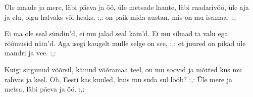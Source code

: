 \"Ule maade ja mere, l\"abi p\"aeva ja \"o\"o,
\"ule metsade laante, l\"abi raadariv\"o\"o,
\"ule aja ja elu, olgu halvaks v\~oi heaks,
:,: on paik mida austan, mis on mu isamaa. :,:

Ei ma ole seal s\"undin'd, ei mu jalad seal k\"ain'd.
Ei mu silmad ta valu ega r\~o\~omusid n\"ain'd.
Aga isegi kaugelt mulle selge on see,
:,: et juured on pikad \"ule mandri ja vee. :,:

Kuigi sirgunud v\~o\~orsil, k\"ainud v\~o\~oramaa teel,
on mu soovid ja m\~otted kus mu rahvas ja keel.
Oh, Eesti kas kuuled, kuis mu s\"uda sul l\"o\"ob?
:,: \"Ule mere ja metsa, l\"abi p\"aeva ja \"o\"o. :,: 